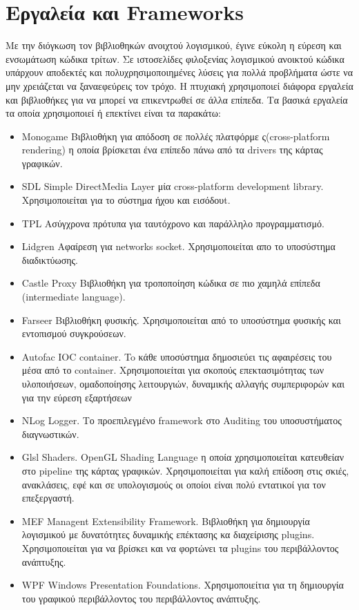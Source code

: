 \section{Εργαλεία και Frameworks}
Με την διόγκωση τον βιβλιοθηκών ανοιχτού λογισμικού, έγινε εύκολη η εύρεση και ενσωμάτωση κώδικα τρίτων. Σε ιστοσελίδες φιλοξενίας λογισμικού ανοικτού κώδικα υπάρχουν αποδεκτές και πολυχρησιμοποιημένες λύσεις για πολλά προβλήματα ώστε να μην χρειάζεται να ξαναεφεύρεις τον τρόχο. Η πτυχιακή χρησιμοποιεί διάφορα εργαλεία και βιβλιοθήκες για να μπορεί να επικεντρωθεί σε άλλα επίπεδα. Τα βασικά εργαλεία τα οποία χρησιμοποιεί ή επεκτίνει είναι τα παρακάτω:
\begin{itemize}
	\item{Monogame} Βιβλιοθήκη για απόδοση σε πολλές πλατφόρμε ς(cross-platform rendering) η οποία βρίσκεται ένα επίπεδο πάνω από τα drivers της κάρτας γραφικών.
	\item{SDL} Simple DirectMedia Layer μία cross-platform development library. Χρησιμοποιείται για το σύστημα ήχου και εισόδουt.
	\item{TPL} Ασύγχρονα πρότυπα για ταυτόχρονο και παράλληλο προγραμματισμό.
	\item{Lidgren} Αφαίρεση για networks socket. Χρησιμοποιείται απο το υποσύστημα διαδικτύωσης.
	\item{Castle Proxy} Βιβλιοθήκη για τροποποίηση κώδικα σε πιο χαμηλά επίπεδα (intermediate language).
	\item{Farseer} Βιβλιοθήκη φυσικής. Χρησιμοποιείται από το υποσύστημα φυσικής και εντοπισμού συγκρούσεων.
	\item{Autofac} IOC container. To κάθε υποσύστημα δημοσιεύει τις αφαιρέσεις του μέσα από το container. Χρησιμοποιείται για σκοπούς επεκτασιμότητας των υλοποιήσεων, ομαδοποίησης λειτουργιών, δυναμικής αλλαγής συμπεριφορών και για την εύρεση εξαρτήσεων
	\item{NLog} Logger. Το προεπιλεγμένο framework στο Auditing του υποσυστήματος διαγνωστικών.
	\item{Glsl} Shaders. OpenGL Shading Language η οποία χρησιμοποιείται κατευθείαν στο pipeline της κάρτας γραφικών. Χρησιμοποιείται για καλή επίδοση στις σκιές, ανακλάσεις, εφέ και σε υπολογισμούς οι οποίοι είναι πολύ εντατικοί για τον επεξεργαστή.
	\item{MEF} Managent Extensibility Framework. Βιβλιοθήκη για δημιουργία λογισμικού με δυνατότητες δυναμικής επέκτασης κα διαχείρισης plugins. Χρησιμοποιείται για να βρίσκει και να φορτώνει τα plugins του περιβάλλοντος ανάπτυξης.
	\item{WPF} Windows Presentation Foundations. Χρησιμοποιείτια για τη δημιουργία του γραφικού περιβάλλοντος του περιβάλλοντος ανάπτυξης.

\end{itemize}
